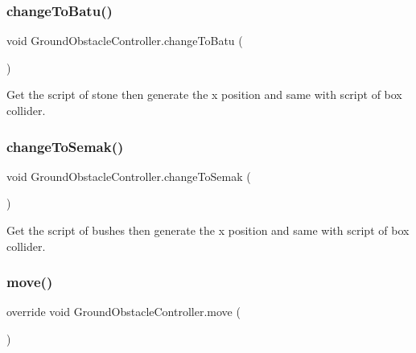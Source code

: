 \subsubsection{\texorpdfstring{change\+To\+Batu()}{changeToBatu()}}
{\footnotesize\ttfamily void Ground\+Obstacle\+Controller.\+change\+To\+Batu (\begin{DoxyParamCaption}{ }\end{DoxyParamCaption})\hspace{0.3cm}{\ttfamily [private]}}



Get the script of stone then generate the x position and same with script of box collider. 

\hypertarget{class_ground_obstacle_controller_a755e906f0dd101886ad14b20dabbe89e}{}\label{class_ground_obstacle_controller_a755e906f0dd101886ad14b20dabbe89e} 
\subsubsection{\texorpdfstring{change\+To\+Semak()}{changeToSemak()}}
{\footnotesize\ttfamily void Ground\+Obstacle\+Controller.\+change\+To\+Semak (\begin{DoxyParamCaption}{ }\end{DoxyParamCaption})\hspace{0.3cm}{\ttfamily [private]}}



Get the script of bushes then generate the x position and same with script of box collider. 

\hypertarget{class_ground_obstacle_controller_aad450d16fef8b23f848f87a81d1790a8}{}\label{class_ground_obstacle_controller_aad450d16fef8b23f848f87a81d1790a8} 
\subsubsection{\texorpdfstring{move()}{move()}}
{\footnotesize\ttfamily override void Ground\+Obstacle\+Controller.\+move (\begin{DoxyParamCaption}{ }\end{DoxyParamCaption})\hspace{0.3cm}{\ttfamily [virtual]}}



